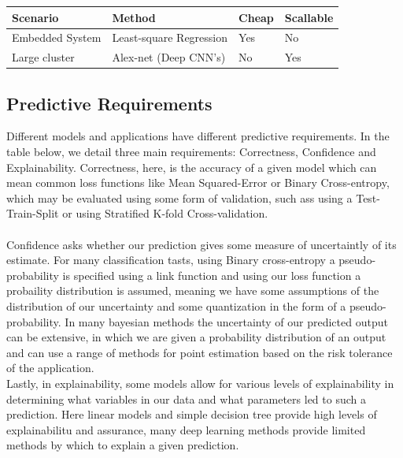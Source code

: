 \documentclass[12pt]{report}
\begin{document}
\begin{center}
\begin{tabular}{|l|l|l|l|}
\hline
\textbf{Scenario} & \textbf{Method}         & \textbf{Cheap} & \textbf{Scallable} \\ \hline
Embedded System   & Least-square Regression & Yes            & No                 \\ \hline
Large cluster     & Alex-net (Deep CNN's)   & No             & Yes                \\ \hline
\end{tabular}
\end{center}

\subsection{Predictive Requirements}
Different models and applications have different predictive requirements.  In the table below, we detail three main requirements: Correctness, Confidence and Explainability.  Correctness, here, is the accuracy of a given model which can mean common loss functions like Mean Squared-Error or Binary Cross-entropy, which may be evaluated using some form of validation, such ass using a Test-Train-Split or using Stratified K-fold Cross-validation. \\ 
\\
Confidence asks whether our prediction gives some measure of uncertaintly of its estimate.  For many classification tasts, using Binary cross-entropy a pseudo-probability is specified using a link function and using our loss function a probaility distribution is assumed, meaning we have some assumptions of the distribution of our uncertainty and some quantization in the form of a pseudo-probability. In many bayesian methods the uncertainty of our predicted output can be extensive, in which we are given a probability distribution of an output and can use a range of methods for point estimation based on the risk tolerance of the application.  \\
Lastly, in explainability, some models allow for various levels of explainability in determining what variables in our data and what parameters led to such a prediction.  Here linear models and simple decision tree provide high levels of explainabilitu and assurance, many deep learning methods provide limited methods by which to explain a given prediction.  \\
\end{document}

